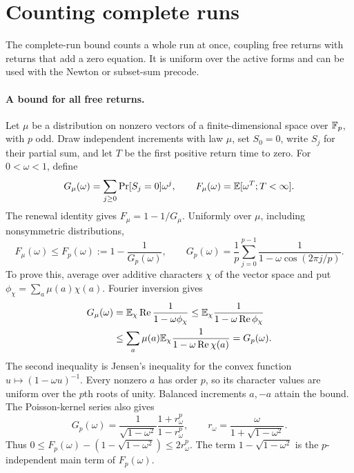 \section{Counting complete runs}\label{app:complete-runs}

The complete-run bound counts a whole run at once, coupling free returns
with returns that add a zero equation. It is uniform over the active
forms and can be used with the Newton or subset-sum precode.

\paragraph{A bound for all free returns.}
Let $\mu$ be a distribution on nonzero vectors of a finite-dimensional
space over $\mathbb F_p$, with $p$ odd. Draw independent increments with law
$\mu$, set $S_0=0$, write $S_j$ for their partial sum, and let $T$ be the first
positive return time to zero. For $0<\omega<1$, define
\[
 G_\mu(\omega)=\sum_{j\ge0}\Pr[S_j=0]\omega^j,
 \qquad F_\mu(\omega)=\mathbb E[\omega^T;T<\infty].
\]
The renewal identity gives $F_\mu=1-1/G_\mu$.
Uniformly over $\mu$, including nonsymmetric distributions,
\begin{equation}\label{eq:complete-free-return}
 F_\mu(\omega)\le F_p(\omega):=1-\frac1{G_p(\omega)},\qquad
 G_p(\omega)=\frac1p\sum_{j=0}^{p-1}\frac1{1-\omega\cos(2\pi j/p)}.
\end{equation}
To prove this, average over additive characters $\chi$ of the vector
space and put $\phi_\chi=\sum_a\mu(a)\chi(a)$. Fourier inversion gives
\[
 \begin{aligned}
 G_\mu(\omega)
 &=\mathbb E_\chi\operatorname{Re}\frac1{1-\omega\phi_\chi}
 \le\mathbb E_\chi\frac1{1-\omega\operatorname{Re}\phi_\chi}\\
 &\le\sum_a\mu(a)\mathbb E_\chi\frac1{1-\omega\operatorname{Re}\chi(a)}
 =G_p(\omega).
 \end{aligned}
\]
The second inequality is Jensen's inequality for the convex function
$u\mapsto(1-\omega u)^{-1}$. Every nonzero $a$ has order $p$, so its character
values are uniform over the $p$th roots of unity. Balanced increments
$a,-a$ attain the bound. The Poisson-kernel series also gives
\begin{equation}\label{eq:finite-cycle-green}
 G_p(\omega)=\frac1{\sqrt{1-\omega^2}}\frac{1+r_\omega^p}{1-r_\omega^p},
 \qquad r_\omega=\frac{\omega}{1+\sqrt{1-\omega^2}}.
\end{equation}
Thus $0\le F_p(\omega)-(1-\sqrt{1-\omega^2})\le2r_\omega^p$. The term
$1-\sqrt{1-\omega^2}$ is the $p$-independent main term of $F_p(\omega)$.

